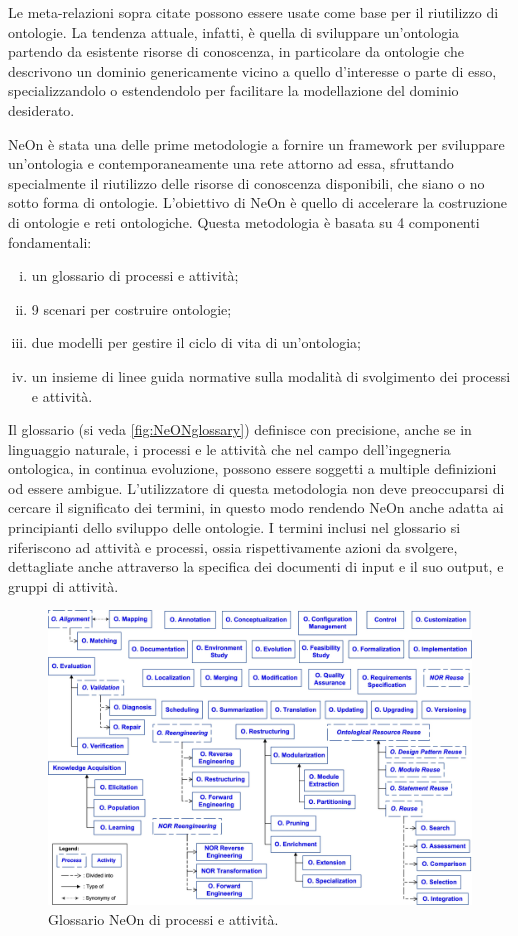 Le meta-relazioni sopra citate possono essere usate come base per il riutilizzo di ontologie. La tendenza attuale, infatti, è quella di sviluppare un'ontologia partendo da esistente risorse di conoscenza, in particolare da ontologie che descrivono un dominio genericamente vicino a quello d'interesse o parte di esso, specializzandolo o estendendolo per facilitare la modellazione del dominio desiderato.



NeOn \cite{NeOn} è stata una delle prime metodologie a fornire un framework per sviluppare un'ontologia e contemporaneamente una rete attorno ad essa, sfruttando specialmente il riutilizzo delle risorse di conoscenza disponibili, che siano o no sotto forma di ontologie. L'obiettivo di NeOn è quello di accelerare la costruzione di ontologie e reti ontologiche.
\newpage\noindent
Questa metodologia è basata su 4 componenti fondamentali:
\begin{enumerate}[i.]
	\item un glossario di processi e attività;
	\label{itm:glossario}
	\item 9 scenari per costruire ontologie;
	\label{itm:scenari}
	\item due modelli per gestire il ciclo di vita di un'ontologia;
	\item un insieme di linee guida normative sulla modalità di svolgimento dei processi e attività.
\end{enumerate}
Il glossario (si veda \autoref{fig:NeONglossary}) definisce con precisione, anche se in linguaggio naturale, i processi e le attività che nel campo dell'ingegneria ontologica, in continua evoluzione, possono essere soggetti a multiple definizioni od essere ambigue. L'utilizzatore di questa metodologia non deve preoccuparsi di cercare il significato dei termini, in questo modo rendendo NeOn anche adatta ai principianti dello sviluppo delle ontologie. I termini inclusi nel glossario si riferiscono ad attività e processi, ossia rispettivamente azioni da svolgere, dettagliate anche attraverso la specifica dei documenti di input e il suo output, e gruppi di attività. 

\begin{figure}
	\centering
	\includegraphics[scale=0.8]{pictures/NeOn-Glossary.jpg}
	\caption{Glossario NeOn \cite{NeOn} di processi e attività.}
	\label{fig:NeONglossary}
\end{figure}

